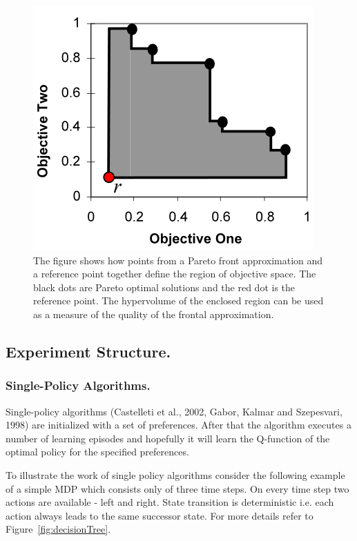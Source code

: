 \begin{figure}[ht]
\centering
\includegraphics[scale=0.9]{hypervolume.png}
\caption{The figure shows how points from a Pareto front approximation and a reference point together define the region of objective space. The black dots are Pareto optimal solutions and the red dot is the reference point. The hypervolume of the enclosed region can be used as a measure of the quality of the frontal approximation.}
\label{fig:hyperVolume}
\end{figure}

\subsection{Experiment Structure.}
\label{sec:experiment-structure}
\subsubsection{Single-Policy Algorithms.}

Single-policy algorithms (Castelleti et al., 2002\nocite{castelletti2002reinforcement}, Gabor, Kalmar and Szepesvari, 1998\nocite{gabor1998multi}) are initialized with a set of preferences. After that the algorithm executes a number of learning episodes and hopefully it will learn the Q-function of the optimal policy for the specified preferences.

To illustrate the work of single policy algorithms consider the following example of a simple MDP which consists only of three time steps. On every time step two actions are available - left and right. State transition is deterministic i.e. each action always leads to the same successor state. For more details refer to Figure~\ref{fig:decisionTree}.\\

